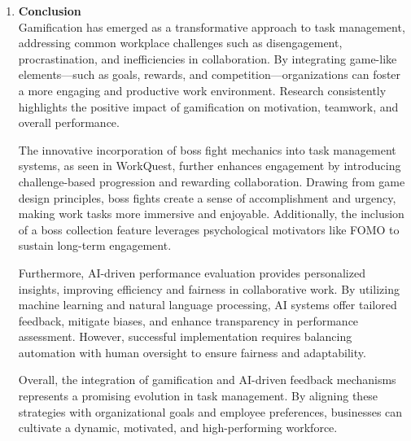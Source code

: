\begin{enumerate}
    
    
    
    \item \textbf{Conclusion} \\
    Gamification has emerged as a transformative approach to task management, addressing common workplace challenges such as disengagement, procrastination, and inefficiencies in collaboration. By integrating game-like elements—such as goals, rewards, and competition—organizations can foster a more engaging and productive work environment. Research consistently highlights the positive impact of gamification on motivation, teamwork, and overall performance.

    The innovative incorporation of boss fight mechanics into task management systems, as seen in WorkQuest, further enhances engagement by introducing challenge-based progression and rewarding collaboration. Drawing from game design principles, boss fights create a sense of accomplishment and urgency, making work tasks more immersive and enjoyable. Additionally, the inclusion of a boss collection feature leverages psychological motivators like FOMO to sustain long-term engagement.

    Furthermore, AI-driven performance evaluation provides personalized insights, improving efficiency and fairness in collaborative work. By utilizing machine learning and natural language processing, AI systems offer tailored feedback, mitigate biases, and enhance transparency in performance assessment. However, successful implementation requires balancing automation with human oversight to ensure fairness and adaptability.

    Overall, the integration of gamification and AI-driven feedback mechanisms represents a promising evolution in task management. By aligning these strategies with organizational goals and employee preferences, businesses can cultivate a dynamic, motivated, and high-performing workforce.
    
\end{enumerate}  